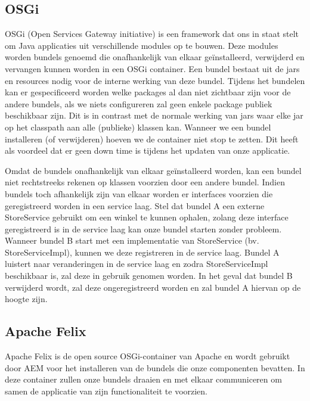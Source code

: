 
	\subsection{OSGi}
	OSGi (Open Services Gateway initiative) is een framework dat ons in staat stelt om Java applicaties uit verschillende modules op te bouwen. Deze modules worden bundels genoemd die onafhankelijk van elkaar ge\"installeerd, verwijderd en vervangen kunnen worden in een OSGi container. Een bundel bestaat uit de jars en resources nodig voor de interne werking van deze bundel. Tijdens het bundelen kan er gespecificeerd worden welke packages al dan niet zichtbaar zijn voor de andere bundels, als we niets configureren zal geen enkele package publiek beschikbaar zijn. Dit is in contrast met de normale werking van jars waar elke jar op het classpath aan alle (publieke) klassen kan. Wanneer we een bundel installeren (of verwijderen) hoeven we de container niet stop te zetten. Dit heeft als voordeel dat er geen down time is tijdens het updaten van onze applicatie.
	\par
	Omdat de bundels onafhankelijk van elkaar ge\"installeerd worden, kan een bundel niet rechtstreeks rekenen op klassen voorzien door een andere bundel. Indien bundels toch afhankelijk zijn van elkaar worden er interfaces voorzien die geregistreerd worden in een service laag. Stel dat bundel A een externe StoreService gebruikt om een winkel te kunnen ophalen, zolang deze interface geregistreerd is in de service laag kan onze bundel starten zonder probleem. Wanneer bundel B start met een implementatie van StoreService (bv. StoreServiceImpl), kunnen we deze registreren in de service laag. Bundel A luistert naar veranderingen in de service laag en zodra StoreServiceImpl beschikbaar is, zal deze in gebruik genomen worden. In het geval dat bundel B verwijderd wordt, zal deze ongeregistreerd worden en zal bundel A hiervan op de hoogte zijn.
	\subsection{Apache Felix}
	Apache Felix is de open source OSGi-container van Apache en wordt gebruikt door AEM voor het installeren van de bundels die onze componenten bevatten. In deze container zullen onze bundels draaien en met elkaar communiceren om samen de applicatie van zijn functionaliteit te voorzien.
